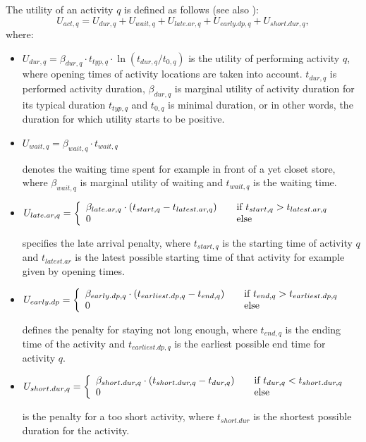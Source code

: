 The utility of an activity $q$ is defined as follows (see also \citet[][p.377ff]{CharyparNagel_Transportation_2005}):
\begin{equation*}
U_{act,q} = U_{dur,q} + U_{wait,q} + U_{late.ar,q} + U_{early.dp, q} + U_{short.dur, q},
\end{equation*}
where:
\begin{itemize}
\item $U_{dur,q}= \beta_{dur,q} \cdot t_{typ,q} \cdot \ln(t_{dur,q}/t_{0,q})$ is the utility of performing activity $q$, where opening times of activity locations are taken into account. $t_{dur,q}$ is performed activity duration, $\beta_{dur,q}$ is marginal utility of activity duration for its typical duration $t_{typ,q}$ and $t_{0,q}$ is minimal duration, or in other words, the duration for which utility starts to be positive. 

\item $ U_{wait,q} = \beta_{wait, q} \cdot t_{wait,q}$ 

denotes the waiting time spent for example in front of a yet closet store, where $\beta_{wait,q}$ is marginal utility of waiting and $t_{wait,q}$ is the waiting time.
		
\item $U_{late.ar,q}= \left\{
  \begin{array}{l l}
    \beta_{late.ar,q} \cdot (t_{start,q} - t_{latest.ar,q}) & \quad \text{if $t_{start,q} > t_{latest.ar,q}$}\\
    0 & \quad \text{else}
  \end{array} \right.$
  
  specifies the late arrival penalty, where $t_{start,q}$ is the starting time of activity $q$ and $t_{latest.ar}$ is the latest possible starting time of that activity for example given by opening times.

\item $U_{early.dp} = \left\{
  \begin{array}{l l}
    \beta_{early.dp,q} \cdot (t_{earliest.dp, q} - t_{end,q}) & \quad \text{if $t_{end,q} > t_{earliest.dp,q}$}\\
    0 & \quad \text{else}
  \end{array} \right.$

defines the penalty for staying not long enough, where $t_{end,q}$ is the ending time of the activity and $t_{earliest.dp,q}$ is the earliest possible end time for activity $q$.

\item $ U_{short.dur, q} = \left\{
  \begin{array}{l l}
    \beta_{short.dur,q} \cdot (t_{short.dur, q} - t_{dur,q}) & \quad \text{if $t_{dur,q} < t_{short.dur,q}$}\\
    0 & \quad \text{else}
  \end{array} \right.$
  
  is the penalty for a too short activity, where $t_{short.dur}$ is the shortest possible duration for the activity.
\end{itemize}
